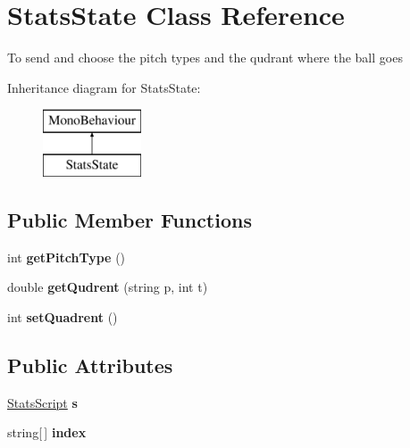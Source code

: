 \hypertarget{class_stats_state}{}\section{Stats\+State Class Reference}
\label{class_stats_state}


To send and choose the pitch types and the qudrant where the ball goes  


Inheritance diagram for Stats\+State\+:\begin{figure}[H]
\begin{center}
\leavevmode
\includegraphics[height=2.000000cm]{class_stats_state}
\end{center}
\end{figure}
\subsection*{Public Member Functions}
\begin{DoxyCompactItemize}
\item 
int {\bfseries get\+Pitch\+Type} ()\hypertarget{class_stats_state_ad4ab77650ce7de75909aff7d878ec4fa}{}\label{class_stats_state_ad4ab77650ce7de75909aff7d878ec4fa}

\item 
double {\bfseries get\+Qudrent} (string p, int t)\hypertarget{class_stats_state_a6ac9b8ce206526521b770c80cd147a0d}{}\label{class_stats_state_a6ac9b8ce206526521b770c80cd147a0d}

\item 
int {\bfseries set\+Quadrent} ()\hypertarget{class_stats_state_aa3a757722aebd1dc49f018c5a0bb4be8}{}\label{class_stats_state_aa3a757722aebd1dc49f018c5a0bb4be8}

\end{DoxyCompactItemize}
\subsection*{Public Attributes}
\begin{DoxyCompactItemize}
\item 
\hyperlink{class_stats_script}{Stats\+Script} {\bfseries s}\hypertarget{class_stats_state_aacf813621ea737a98b35207995e6c9a5}{}\label{class_stats_state_aacf813621ea737a98b35207995e6c9a5}

\item 
string\mbox{[}$\,$\mbox{]} {\bfseries index}\hypertarget{class_stats_state_ad432374b2e99190369b5c595c8eef0ae}{}\label{class_stats_state_ad432374b2e99190369b5c595c8eef0ae}

\end{DoxyCompactItemize}
